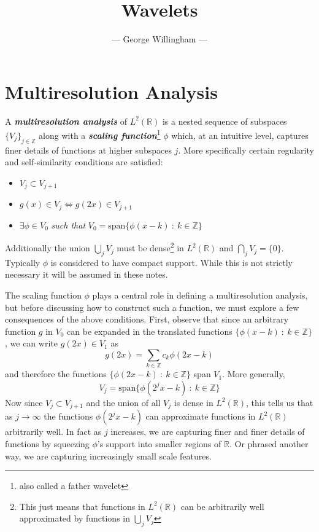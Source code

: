 \documentclass[onecolumn]{gwclass}
\title{Wavelets}
\author{--- George Willingham ---}
\date{}
\begin{document}
	\maketitle
	
	
\section{Multiresolution Analysis}
A \textbf{\emph{multiresolution analysis}} of $L^2(\mathbb{R})$ is a nested sequence of subspaces $\{V_j\}_{j\in\mathbb{Z}}$ along with a \textbf{\emph{scaling function}}\footnote{also called a father wavelet} $\phi$ which, at an intuitive level, captures finer details of functions at higher subspaces $j$. More specifically certain regularity and self-similarity conditions are satisfied:

\begin{itemize}
	\item $V_j \subset V_{j+1}$
	
	\item \emph{$g(x)\in V_j \iff g(2x)\in V_{j+1}$}
	\item  $\exists\phi\in V_0$ \emph{such that} $V_0=\text{span}\{\phi(x-k)\::\:k\in\mathbb{Z}\}$
\end{itemize}
Additionally the union $\bigcup_j V_j$ must be dense\footnote{This just means that functions in $L^2(\mathbb{R})$ can be arbitrarily well approximated by functions in $\bigcup_j V_j$} in $L^2(\mathbb{R})$ and $\bigcap_j V_j = \{0\}$. Typically $\phi$ is considered to have compact support. While this is not strictly necessary it will be assumed in these notes.

The scaling function $\phi$ plays a central role in defining a multiresolution analysis, but before discussing how to construct such a function, we must explore a few consequences of the above conditions. First, observe that since an arbitrary function $g$ in $V_0$ can be expanded in the translated functions $\{\phi(x-k)\::\:k\in\mathbb{Z}  \}$, we can write $g(2x)\in V_1$ as
$$ g(2x) = \sum_{k\in\mathbb{Z}} c_k \phi(2x - k) $$
and therefore the functions $\{\phi(2x-k)\::\:k\in\mathbb{Z}\}$ span $V_1$. More generally,
$$ V_j = \text{span}\{ \phi(2^jx - k) \::\:k\in\mathbb{Z}\} $$
Now since $V_j \subset V_{j+1}$ and the union of all $V_j$ is dense in $L^2(\mathbb{R})$, this tells us that as $j\to\infty$ the functions $\phi(2^jx-k)$ can approximate functions in $L^2(\mathbb{R})$ arbitrarily well. In fact as $j$ increases, we are capturing finer and finer details of functions by squeezing $\phi$'s support into smaller regions of $\mathbb{R}$. Or phrased another way, we are capturing increasingly small scale features.
\end{document}
